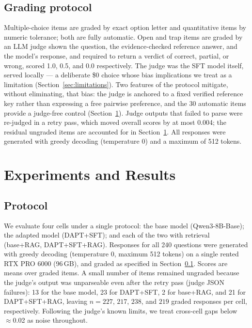\documentclass[11pt]{article}
\begin{document}
\subsection{Grading protocol}
\label{sec:grading}

Multiple-choice items are graded by exact option letter and quantitative
items by numeric tolerance; both are fully automatic. Open and trap items
are graded by an LLM judge shown the question, the evidence-checked
reference answer, and the model's response, and required to return a
verdict of correct, partial, or wrong, scored 1.0, 0.5, and 0.0
respectively. The judge was the SFT model itself, served locally --- a
deliberate \$0 choice whose bias implications we treat as a limitation
(Section~\ref{sec:limitations}). Two features of the protocol mitigate,
without eliminating, that bias: the judge is anchored to a fixed verified
reference key rather than expressing a free pairwise preference, and the
30 automatic items provide a judge-free control
(Section~\ref{sec:experiments}). Judge outputs that failed to parse were
re-judged in a retry pass, which moved overall scores by at most 0.004;
the residual ungraded items are accounted for in
Section~\ref{sec:experiments}. All responses were generated with greedy
decoding (temperature 0) and a maximum of 512 tokens.

\section{Experiments and Results}
\label{sec:experiments}

\subsection{Protocol}

We evaluate four cells under a single protocol: the base model
(Qwen3-8B-Base); the adapted model (DAPT+SFT); and each of the two with
retrieval (base+RAG, DAPT+SFT+RAG). Responses for all 240 questions were
generated with greedy decoding (temperature 0, maximum 512 tokens) on a
single rented RTX PRO 6000 (96\,GB), and graded as specified in
Section~\ref{sec:grading}. Scores are means over graded items. A small
number of items remained ungraded because the judge's output was
unparseable even after the retry pass (judge JSON failures): 13 for the
base model, 23 for DAPT+SFT, 2 for base+RAG, and 21 for DAPT+SFT+RAG,
leaving $n = 227$, $217$, $238$, and $219$ graded responses per cell,
respectively. Following the judge's known limits, we treat cross-cell gaps
below $\approx$0.02 as noise throughout.
\end{document}
